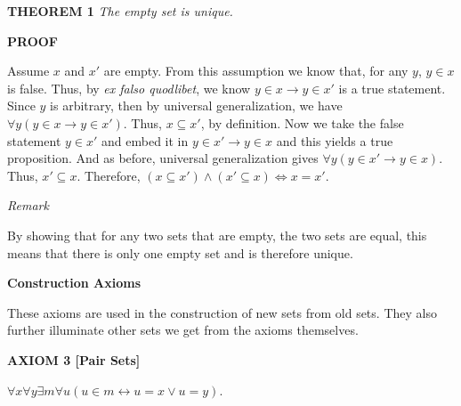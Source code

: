 \documentclass[12pt, a4paper]{article}
\begin{document}
\vspace{4mm}

\noindent\textbf{THEOREM 1}\textit{ The empty set is unique.}

\vspace{4mm}

\noindent\textbf{PROOF}

\vspace{4mm}


Assume $x$ and $x'$ are empty. From this assumption we know that, for any $y$, $y\in x$ is false. Thus, by \textit{ex falso quodlibet}, we know $y\in x\rightarrow y\in x'$ is a true statement. Since $y$ is arbitrary, then by universal generalization, we have $\forall y(y\in x\rightarrow y\in x')$. Thus, $x\subseteq x'$, by definition. Now we take the false statement $y\in x'$ and embed it in $y\in x'\rightarrow y\in x$ and this yields a true proposition. And as before, universal generalization gives $\forall y(y\in x'\rightarrow y\in x)$. Thus, $x'\subseteq x$. Therefore, $(x\subseteq x')\wedge (x'\subseteq x)\Leftrightarrow x=x'$.


\vspace{6mm}

\noindent\large\textit{Remark}\normalsize

\vspace{4mm}

By showing that for any two sets that are empty, the two sets are equal, this means that there is only one empty set and is therefore unique.\par

\vspace{10mm}

\newpage

\noindent\large\textbf{Construction Axioms}\normalsize\par

\vspace{4mm}

\noindent These axioms are used in the construction of new sets from old sets. They also further illuminate other sets we get from the axioms themselves.\par

\vspace{4mm}

\noindent\blacksquare\textbf{ AXIOM 3 [Pair Sets]}\par

\vspace{4mm}

$\forall x\forall y\exists m\forall u(u\in m\leftrightarrow u=x\vee u=y)$.\par
\end{document}
